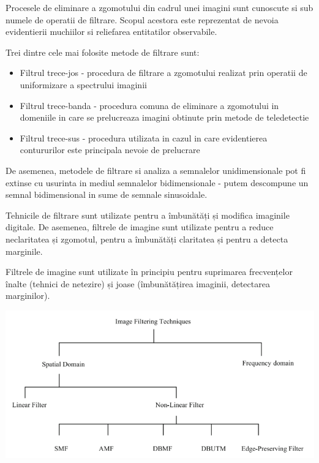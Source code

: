 \documentclass[10pt]{article}
\begin{document}
\> Procesele de eliminare a zgomotului din cadrul unei imagini sunt cunoscute si sub numele de
operatii de filtrare. Scopul acestora este reprezentat de nevoia evidentierii muchiilor si reliefarea entitatilor observabile.

\> Trei dintre cele mai folosite metode de filtrare sunt:


\begin{itemize}

	\item Filtrul trece-jos - procedura de filtrare a zgomotului realizat prin operatii de uniformizare a spectrului imaginii
	\item Filtrul trece-banda - procedura comuna de eliminare a zgomotului in domeniile in care se prelucreaza imagini obtinute prin metode de teledetectie
	\item Filtrul trece-sus - procedura utilizata in cazul in care evidentierea contururilor este principala nevoie de prelucrare

\end{itemize}

\> De asemenea, metodele de filtrare si analiza a semnalelor unidimensionale pot fi extinse cu usurinta in mediul semnalelor bidimensionale - putem
descompune un semnal bidimensional in sume de semnale sinusoidale.

\newpage

\> Tehnicile de filtrare sunt utilizate pentru a îmbunătăți și modifica imaginile digitale.
De asemenea, filtrele de imagine sunt utilizate pentru a reduce neclaritatea și zgomotul, pentru a îmbunătăți claritatea
și pentru a detecta marginile.

\> Filtrele de imagine sunt utilizate în principiu pentru suprimarea frecvențelor înalte
(tehnici de netezire) și joase (îmbunătățirea imaginii, detectarea marginilor).

\begin{center}

  \includegraphics[scale=0.5]{image-filters-classification}
  
\end{center}
\end{document}

